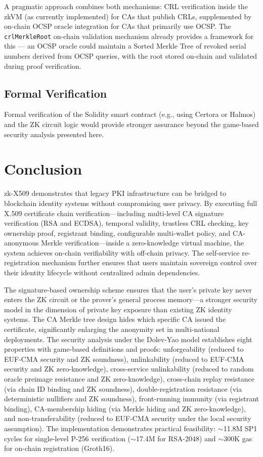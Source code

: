 \documentclass[11pt, a4paper]{article}
\begin{document}
A pragmatic approach combines both mechanisms: CRL verification inside
the zkVM (as currently implemented) for CAs that publish CRLs,
supplemented by on-chain OCSP oracle integration for CAs that primarily
use OCSP. The \texttt{crlMerkleRoot} on-chain validation mechanism
already provides a framework for this --- an OCSP oracle could maintain
a Sorted Merkle Tree of revoked serial numbers derived from OCSP
queries, with the root stored on-chain and validated during proof
verification.

\subsection{Formal Verification}\label{formal-verification}

Formal verification of the Solidity smart contract (e.g., using Certora
or Halmos) and the ZK circuit logic would provide stronger assurance
beyond the game-based security analysis presented here.


\section{Conclusion}\label{conclusion}

zk-X509 demonstrates that legacy PKI infrastructure can be bridged to
blockchain identity systems without compromising user privacy. By
executing full X.509 certificate chain verification---including
multi-level CA signature verification (RSA and ECDSA), temporal
validity, trustless CRL checking, key ownership proof, registrant
binding, configurable multi-wallet policy, and CA-anonymous Merkle
verification---inside a zero-knowledge virtual machine, the system
achieves on-chain verifiability with off-chain privacy. The self-service
re-registration mechanism further ensures that users maintain sovereign
control over their identity lifecycle without centralized admin
dependencies.

The signature-based ownership scheme ensures that the user's private key
never enters the ZK circuit or the prover's general process memory---a
stronger security model in the dimension of private key exposure than
existing ZK identity systems. The
CA Merkle tree design hides which specific CA issued the certificate,
significantly enlarging the anonymity set in multi-national deployments.
The security analysis under the Dolev-Yao model establishes eight
properties with game-based definitions and proofs: unforgeability
(reduced to EUF-CMA security and ZK soundness), unlinkability (reduced
to EUF-CMA security and ZK zero-knowledge), cross-service unlinkability
(reduced to random oracle preimage resistance and ZK zero-knowledge), cross-chain replay resistance
(via chain ID binding and ZK soundness), double-registration
resistance (via deterministic nullifiers and ZK soundness),
front-running immunity (via registrant binding), CA-membership hiding (via
Merkle hiding and ZK zero-knowledge), and non-transferability (reduced
to EUF-CMA security under the local security assumption). The
implementation demonstrates practical feasibility: $\sim$11.8M
SP1 cycles for single-level P-256 verification ($\sim$17.4M for
RSA-2048) and $\sim$300K gas for on-chain registration
(Groth16).
\end{document}
